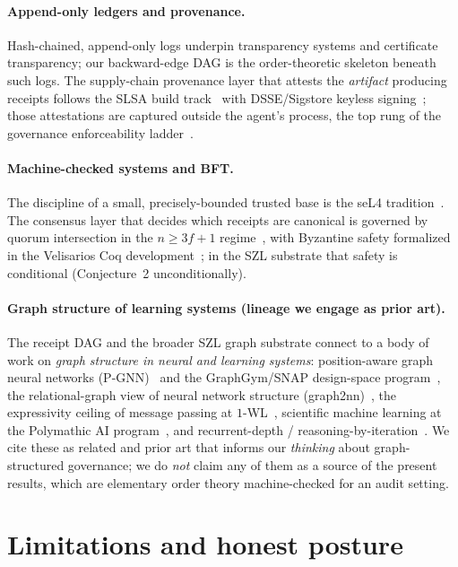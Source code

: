 \documentclass[11pt,letterpaper]{article}
\theoremstyle{definition}
\begin{document}
\paragraph{Append-only ledgers and provenance.} Hash-chained, append-only logs
underpin transparency systems and certificate transparency; our backward-edge
DAG is the order-theoretic skeleton beneath such logs. The supply-chain
provenance layer that attests the \emph{artifact} producing receipts follows the
SLSA build track~\cite{slsa} with DSSE/Sigstore keyless signing~\cite{sigstore};
those attestations are captured outside the agent's process, the top rung of the
governance enforceability ladder~\cite{armo2025}.

\paragraph{Machine-checked systems and BFT.} The discipline of a small,
precisely-bounded trusted base is the seL4 tradition~\cite{sel4}. The consensus
layer that decides which receipts are canonical is governed by quorum
intersection in the $n \geq 3f+1$ regime~\cite{pbft,lamport1982}, with Byzantine
safety formalized in the Velisarios Coq development~\cite{velisarios}; in the SZL
substrate that safety is conditional (Conjecture~2 unconditionally).

\paragraph{Graph structure of learning systems (lineage we engage as prior
art).} The receipt DAG and the broader SZL graph substrate connect to a body of
work on \emph{graph structure in neural and learning systems}: position-aware
graph neural networks (P-GNN)~\cite{you2019pgnn} and the GraphGym/SNAP
design-space program~\cite{you2020graphgym}, the relational-graph view of neural
network structure (graph2nn)~\cite{you2020graph2nn}, the expressivity ceiling of
message passing at $1$-WL~\cite{xu2019gin}, scientific machine learning at
the Polymathic AI program~\cite{mccabe2023multiphysics}, and recurrent-depth /
reasoning-by-iteration~\cite{mcleish2024abacus}. We cite these as related and
prior art that informs our \emph{thinking} about graph-structured governance; we
do \emph{not} claim any of them as a source of the present results, which are
elementary order theory machine-checked for an audit setting.

\section{Limitations and honest posture}\label{sec:limits}
\end{document}
